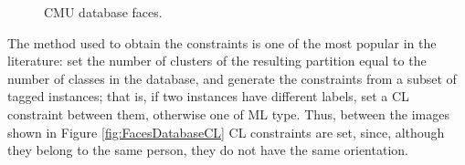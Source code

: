 \clearpage

\begin{figure}[bth]
	\myfloatalign
	 \quad
	 \quad
	 \quad
	\caption[CMU database faces.]{CMU database faces. \cite{davidson2007survey}}\label{fig:CMUFacesDatabase}
\end{figure}

The method used to obtain the constraints is one of the most popular in the literature: set the number of clusters of the resulting partition equal to the number of classes in the database, and generate the constraints from a subset of tagged instances; that is, if two instances have different labels, set a \acf{CL} constraint between them, otherwise one of \acf{ML} type. Thus, between the images shown in Figure \ref{fig:FacesDatabaseCL} \acf{CL} constraints are set, since, although they belong to the same person, they do not have the same orientation.


